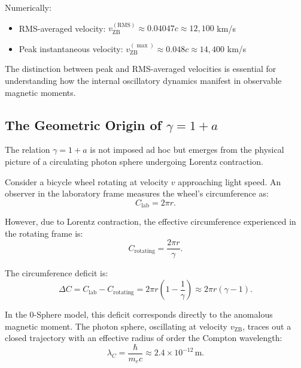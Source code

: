 \documentclass[12pt,letterpaper]{article}
\begin{document}
Numerically:
\begin{itemize}
\item RMS-averaged velocity: $v_{\mathrm{ZB}}^{(\mathrm{RMS})} \approx 0.04047c \approx 12{,}100$ km/s
\item Peak instantaneous velocity: $v_{\mathrm{ZB}}^{(\max)} \approx 0.048c \approx 14{,}400$ km/s
\end{itemize}

The distinction between peak and RMS-averaged velocities is essential for understanding how the internal oscillatory dynamics manifest in observable magnetic moments.

\subsection{The Geometric Origin of $\gamma = 1 + a$}

The relation $\gamma = 1 + a$ is not imposed ad hoc but emerges from the physical picture of a circulating photon sphere undergoing Lorentz contraction.

Consider a bicycle wheel rotating at velocity $v$ approaching light speed. An observer in the laboratory frame measures the wheel's circumference as:
\begin{equation}
C_{\mathrm{lab}} = 2\pi r.
\end{equation}

However, due to Lorentz contraction, the effective circumference experienced in the rotating frame is:
\begin{equation}
C_{\mathrm{rotating}} = \frac{2\pi r}{\gamma}.
\end{equation}

The circumference deficit is:
\begin{equation}
\Delta C = C_{\mathrm{lab}} - C_{\mathrm{rotating}} = 2\pi r \left(1 - \frac{1}{\gamma}\right) \approx 2\pi r (\gamma - 1).
\end{equation}

In the 0-Sphere model, this deficit corresponds directly to the anomalous magnetic moment. The photon sphere, oscillating at velocity $v_{\mathrm{ZB}}$, traces out a closed trajectory with an effective radius of order the Compton wavelength:
\begin{equation}
\lambda_C = \frac{\hbar}{m_e c} \approx 2.4 \times 10^{-12} \, \mathrm{m}.
\end{equation}
\end{document}
